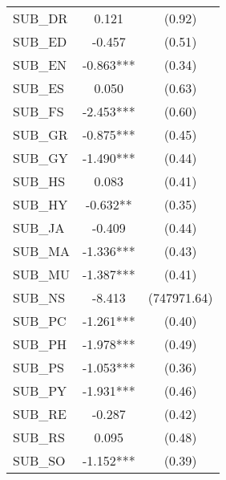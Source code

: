 \begin{table}[htb]
\begin{threeparttable}
\begin{tabular}{l c c}
      SUB\_DR                               & 0.121                  & (0.92)               \\
      SUB\_ED                               & -0.457                 & (0.51)               \\
      SUB\_EN                               & -0.863***              & (0.34)               \\
      SUB\_ES                               & 0.050                  & (0.63)               \\
      SUB\_FS                               & -2.453***              & (0.60)               \\
      SUB\_GR                               & -0.875***              & (0.45)               \\
      SUB\_GY                               & -1.490***              & (0.44)               \\
      SUB\_HS                               & 0.083                  & (0.41)               \\
      SUB\_HY                               & -0.632**               & (0.35)               \\
      SUB\_JA                               & -0.409                 & (0.44)               \\
      SUB\_MA                               & -1.336***              & (0.43)               \\
      SUB\_MU                               & -1.387***              & (0.41)               \\
      SUB\_NS                               & -8.413                 & (747971.64)          \\
      SUB\_PC                               & -1.261***              & (0.40)               \\
      SUB\_PH                               & -1.978***              & (0.49)               \\
      SUB\_PS                               & -1.053***              & (0.36)               \\
      SUB\_PY                               & -1.931***              & (0.46)               \\
      SUB\_RE                               & -0.287                 & (0.42)               \\
      SUB\_RS                               & 0.095                  & (0.48)               \\
      SUB\_SO                               & -1.152***              & (0.39)               \\

\end{tabular}
\end{threeparttable}
\end{table}
